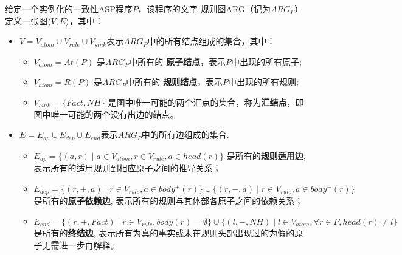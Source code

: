 \begin{definition}[文字-规则图ARG]
    给定一个实例化的一致性ASP程序$P$，该程序的文字-规则图ARG（记为$ARG_P$）定义一张图$\langle V, E \rangle $，其中：
    \begin{itemize}[topsep=0pt]
      \setlength\itemsep{-0.3em}
      \item $V=V_{atom} \cup V_{rule} \cup V_{sink}$表示$ARG_P$中的所有结点组成的集合，其中：
      \begin{itemize}[label=$\circ$,topsep=0pt]
        \setlength\itemsep{-0.3em}
        \item $V_{atom} = At(P)$ 是$ARG_P$中所有的 \textbf{原子结点}，表示$P$中出现的所有原子;
        \item $V_{atom} = R(P)$ 是$ARG_P$中所有的 \textbf{规则结点}，表示$P$中出现的所有规则;
        \item $V_{sink} = \{Fact, NH\}$ 是图中唯一可能的两个汇点的集合，称为\textbf{汇结点}，即图中唯一可能的两个没有出边的结点。
      \end{itemize}
      \item $E=E_{ap} \cup E_{dep} \cup E_{end}$表示$ARG_P$中的所有边组成的集合.
      \begin{itemize}[label=$\circ$,topsep=0pt]
        \setlength\itemsep{-0.3em}
        \item $E_{ap} = \{(a, r) \mid a \in V_{atom}, r \in V_{rule}, a \in head(r) \}$ 是所有的\textbf{规则适用边}, 表示所有的适用规则到相应原子之间的推导关系；
        \item $E_{dep} = \{(r, +, a) \mid r \in V_{rule}, a \in body^+(r) \} \cup \{(r, -, a) \mid r \in V_{rule}, a \in body^-(r) \}$ 是所有的\textbf{原子依赖边}, 表示所有的规则与其体部各原子之间的依赖关系；
        \item $E_{end}=\{(r, +, Fact) \mid r \in V_{rule}, body(r)=\emptyset\} \cup \{(l, -, NH) \mid l \in V_{atom}, \forall r \in P, head(r) \neq l\}$是所有的\textbf{终结边}, 表示所有为真的事实或未在规则头部出现过的为假的原子无需进一步再解释。
      \end{itemize}
    \end{itemize}
\end{definition}
